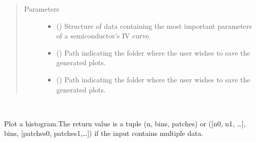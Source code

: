 \documentclass[letterpaper,10pt,english,openany, oneside]{sphinxmanual}
\begin{document}
\begin{fulllineitems}
\begin{fulllineitems}
\begin{quote}\begin{description}
\item[{Parameters}] \leavevmode\begin{itemize}
\item {} 
 () \textendash{} Structure of data containing the most important parameters of a semiconductor’s IV curve.

\item {} 
 (\sphinxstyleliteralemphasis{\sphinxupquote{, }}) \textendash{} Path indicating the folder where the user wishes to save the generated plots.

\item {} 
 (\sphinxstyleliteralemphasis{\sphinxupquote{, }}) \textendash{} Path indicating the folder where the user wishes to save the generated plots.

\end{itemize}

\end{description}\end{quote}

\end{fulllineitems}


\begin{fulllineitems}
\label{\detokenize{index:fompy.plots.plotter.hist}}~

\begin{fulllineitems}
Plot a histogram.The return value is a tuple (n, bins, patches) or ({[}n0, n1, …{]},
bins, {[}patches0, patches1,…{]}) if the input contains multiple data.


\end{fulllineitems}
\end{fulllineitems}
\end{fulllineitems}
\end{document}
